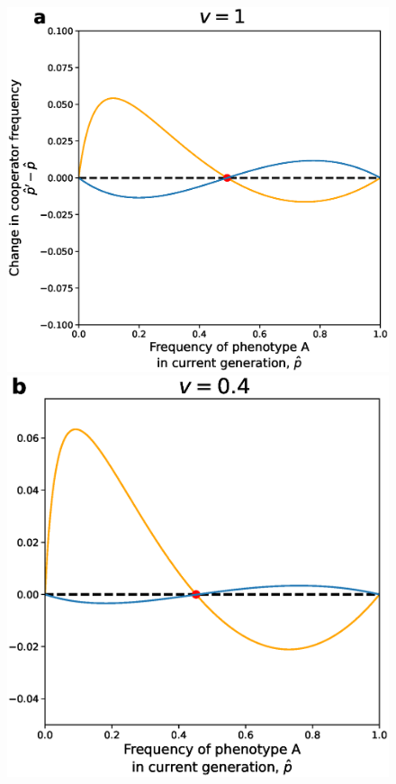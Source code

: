 \documentclass[12pt]{extarticle}
\begin{document}
\begin{figure}[p]
  \centering
    \includegraphics[scale=0.4]{coexistence_without_oblique.eps}
    \includegraphics[scale=0.4]{coexistence_with_oblique.eps}

\end{figure}
\end{document}
